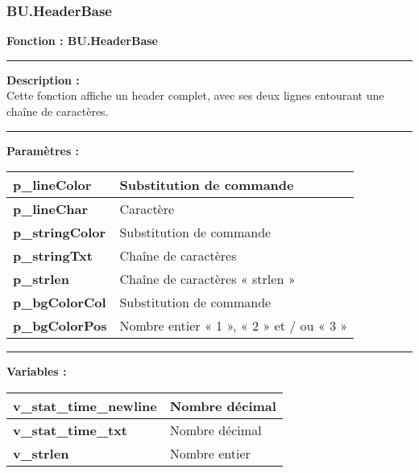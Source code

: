 \documentclass[a4paper,10pt]{article}
\begin{document}
\color{sec3}
\subsubsection{BU.HeaderBase}\color{text}

\textbf{Fonction : \color{func}BU.HeaderBase}\\

\par\noindent\rule{\textwidth}{0.4pt}

\begin{justify}
    \textbf{Description :}\\[1\baselineskip]
    Cette fonction affiche un header complet, avec ses deux lignes entourant une chaîne de caractères.
\end{justify}

\par\noindent\rule{\textwidth}{0.4pt}

\begin{justify}
    \textbf{Paramètres :}

    \begin{tabular}{|l|l|}
        \hline
        \textbf{\color{vars}p\_lineColor} & Substitution de commande\\
        \hline
        \textbf{\color{vars}p\_lineChar} & Caractère\\
        \hline
        \textbf{\color{vars}p\_stringColor} & Substitution de commande\\
        \hline
        \textbf{\color{vars}p\_stringTxt} & Chaîne de caractères\\
        \hline
        \textbf{\color{vars}p\_strlen} & Chaîne de caractères « strlen »\\
        \hline
        \textbf{\color{vars}p\_bgColorCol} & Substitution de commande\\
        \hline
        \textbf{\color{vars}p\_bgColorPos} & Nombre entier « 1 », « 2 » et / ou « 3 »\\
        \hline
    \end{tabular}
\end{justify}

\setlength{\parskip}{2em}
\par\noindent\rule{\textwidth}{0.4pt}\setlength{\parskip}{1em}

\begin{justify}
    \textbf{Variables :}\\[1\baselineskip]
    \begin{tabular}{|l|l|}
        \hline
        \textbf{\color{vars}v\_stat\_time\_newline} & Nombre décimal\\
        \hline
        \textbf{\color{vars}v\_stat\_time\_txt} & Nombre décimal\\
        \hline
        \textbf{\color{vars}v\_strlen} & Nombre entier\\
        \hline
    \end{tabular}
\end{justify}
\end{document}
